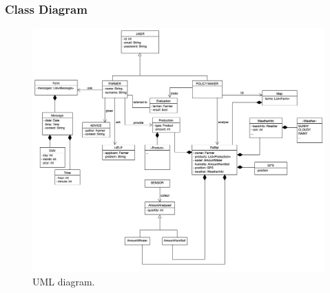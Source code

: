 \documentclass{article}
\begin{document}
\subsubsection{Class Diagram}
\begin{figure}[H]
    \begin{center}
    \includegraphics[width=1\textwidth]{images/UMLSW2_1.png}
    \caption{UML diagram.}
    \label{fig:uml}
    \end{center}
\end{figure}
\end{document}
